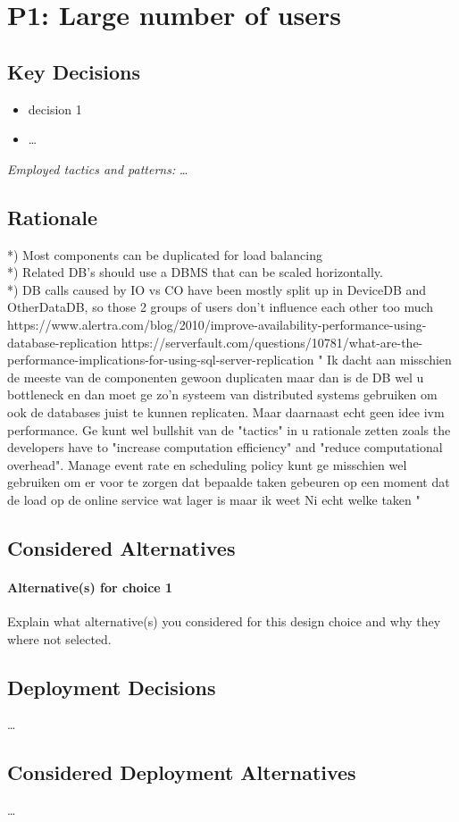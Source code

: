 \section{P1: Large number of users}

    \subsection*{Key Decisions}

        \begin{itemize}
        	\item decision 1
        	\item \ldots
        \end{itemize}
        \emph{Employed tactics and patterns:} \ldots

    \subsection*{Rationale}

        *) Most components can be duplicated for load balancing\\
        *) Related DB's should use a DBMS that can be scaled horizontally.\\
        *) DB calls caused by IO vs CO have been mostly split up in DeviceDB and OtherDataDB, so those 2 groups of
           users don't influence each other too much\\

        https://www.alertra.com/blog/2010/improve-availability-performance-using-database-replication
        https://serverfault.com/questions/10781/what-are-the-performance-implications-for-using-sql-server-replication
        "
        Ik dacht aan misschien de meeste van de componenten gewoon duplicaten maar dan is de DB wel u bottleneck en dan moet ge zo'n systeem van distributed systems gebruiken om ook de databases juist te kunnen replicaten.
        Maar daarnaast echt geen idee ivm performance. Ge kunt wel bullshit van de "tactics" in u rationale zetten zoals the developers have to "increase computation efficiency" and "reduce computational overhead".
        Manage event rate en scheduling policy kunt ge misschien wel gebruiken om er voor te zorgen dat bepaalde taken gebeuren op een moment dat de load op de online service wat lager is maar ik weet Ni echt welke taken
        "

    \subsection*{Considered Alternatives}
        \paragraph{Alternative(s) for choice 1} Explain what alternative(s) you
        considered for this design choice and why they where not selected.

    \subsection*{Deployment Decisions}
        \ldots

    \subsection*{Considered Deployment Alternatives}
        \ldots
